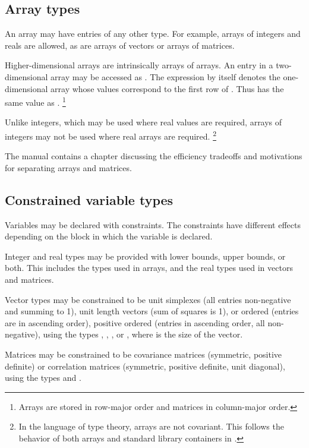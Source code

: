 \documentclass[article]{jss}
\begin{document}
\subsection{Array types}

An array may have entries of any other type.  For example, arrays of
integers and reals are allowed, as are arrays of vectors or arrays of
matrices.  

Higher-dimensional arrays are intrinsically arrays of arrays.  An
entry in a two-dimensional array  may be accessed as
.  The expression  by itself denotes the
one-dimensional array whose values correspond to the first row of
.  Thus  has the same value as .%
%
\footnote{Arrays are stored in row-major order and matrices in
  column-major order.}

Unlike integers, which may be used where real values are required,
arrays of integers may not be used where real arrays are required.%
%
\footnote{In the language of type theory,  arrays are
  not covariant.  This follows the behavior of both arrays and
  standard library containers in .}

The manual contains a chapter discussing the efficiency tradeoffs and
motivations for separating arrays and matrices.

\subsection{Constrained variable types}

Variables may be declared with constraints.  The constraints have
different effects depending on the block in which the variable is
declared.

Integer and real types may be provided with lower bounds, upper
bounds, or both.  This includes the types used in arrays, and the real
types used in vectors and matrices.

Vector types may be constrained to be unit simplexes (all entries
non-negative and summing to 1), unit length vectors (sum of squares is 1), or
ordered (entries are in ascending order), positive ordered (entries in
ascending order, all non-negative), using the types ,
, , or
, where  is the size of the vector.

Matrices may be constrained to be covariance matrices (symmetric,
positive definite) or correlation matrices (symmetric, positive
definite, unit diagonal), using the types  and
.
\end{document}
